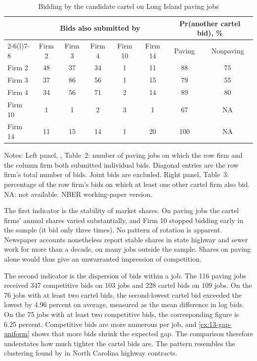\begin{table}[htbp]
\centering
\caption{Bidding by the candidate cartel on Long Island paving jobs}\label{tab:13-pz-cartel}
\small
\begin{tabular}{@{}lccccc@{\hspace{2em}}cc@{}}
\toprule
 & \multicolumn{5}{c}{Bids also submitted by} & \multicolumn{2}{c}{Pr(another cartel bid), \%}\\
\cmidrule(lr){2-6}\cmidrule(l){7-8}
 & Firm 2 & Firm 3 & Firm 4 & Firm 10 & Firm 14 & Paving & Nonpaving\\
\midrule
Firm 2  & 48 & 37 & 34 & 1 & 11 & 88 & 75\\
Firm 3  & 37 & 86 & 56 & 1 & 15 & 79 & 55\\
Firm 4  & 34 & 56 & 71 & 2 & 14 & 89 & 80\\
Firm 10 & 1  & 1  & 2  & 3 & 1  & 67 & NA\\
Firm 14 & 11 & 15 & 14 & 1 & 20 & 100 & NA\\
\bottomrule
\end{tabular}

\smallskip
\begin{minipage}{0.92\textwidth}\footnotesize
Notes: Left panel, \citet{PorterZona1993}, Table~2: number of paving jobs on which the row firm and the column firm
both submitted individual bids. Diagonal entries are the row firm's total number of bids. Joint bids are excluded.
Right panel, Table~3: percentage of the row firm's bids on which at least one other cartel firm also bid. NA: not
available. NBER working-paper version.
\end{minipage}
\end{table}

The first indicator is the stability of market shares. On paving jobs the cartel firms' annual shares varied
substantially, and Firm 10 stopped bidding early in the sample (it bid only three times). No pattern of rotation is
apparent. Newspaper accounts nonetheless report stable shares in state highway and sewer work for more than a
decade, on many jobs outside the sample. Shares on paving alone would thus give an unwarranted impression of
competition.

The second indicator is the dispersion of bids within a job. The 116 paving jobs received 347 competitive bids on
103 jobs and 228 cartel bids on 109 jobs. On the 76 jobs with at least two cartel bids, the second-lowest cartel bid
exceeded the lowest by 4.96 percent on average, measured as the mean difference in log bids. On the 75 jobs with at
least two competitive bids, the corresponding figure is 6.25 percent. Competitive bids are more numerous per job,
and \cref{ex:13-gap-uniform} shows that more bids shrink the expected gap. The comparison therefore understates
how much tighter the cartel bids are. The pattern resembles the clustering found by \citet{FeinsteinBlockNold1985}
in North Carolina highway contracts.

